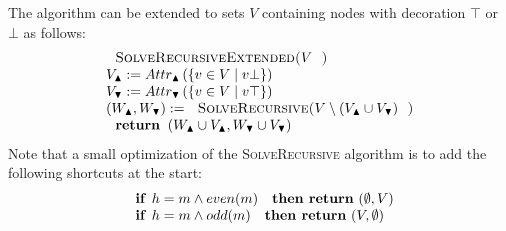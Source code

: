 The algorithm can be extended to sets $V$ containing nodes with decoration $%
\top $ or $\bot $ as follows:%
\begin{equation*}
\begin{array}{l}
\text{\textsc{SolveRecursiveExtended(}}V\text{\textsc{)}} \\ 
V_{\blacktriangle }:=Attr_{\blacktriangle }\left( \{v\in V\mid v\bot
\}\right)  \\ 
V_{\blacktriangledown }:=Attr_{\blacktriangledown }\left( \{v\in V\mid v\top
\}\right)  \\ 
\left( W_{\blacktriangle },W_{\blacktriangledown }\right) :=\text{\textsc{%
SolveRecursive(}}V\setminus (V_{\blacktriangle }\cup V_{\blacktriangledown })%
\text{\textsc{)}} \\ 
\text{\textbf{return }}\left( W_{\blacktriangle }\cup V_{\blacktriangle
},W_{\blacktriangledown }\cup V_{\blacktriangledown }\right) 
\end{array}%
\end{equation*}%
Note that a small optimization of the \textsc{SolveRecursive} algorithm is
to add the following shortcuts at the start:%
\begin{equation*}
\begin{array}{l}
\text{\textbf{if }}h=m\wedge even(m)\text{ \textbf{then return} }(\emptyset
,V) \\ 
\text{\textbf{if }}h=m\wedge odd(m)\text{ \textbf{then return} }(V,\emptyset
)%
\end{array}%
\end{equation*}%
\newpage 
